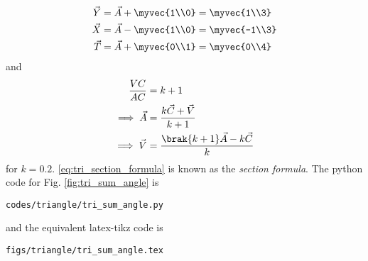 \begin{enumerate}[label=\arabic*.,ref=\thesubsection.\theenumi]
\begin{align}
\vec{Y} &= \vec{A} + \myvec{1\\0} = \myvec{1\\3}
\\
\vec{X} &= \vec{A} - \myvec{1\\0} = \myvec{-1\\3}
\\
\vec{T} &= \vec{A} + \myvec{0\\1} = \myvec{0\\4}
\end{align}
%
and 
\begin{align}
\frac{VC}{AC} &= k+1
\\
\label{eq:tri_section_formula}
\implies \vec{A} &= \frac{k\vec{C} + \vec{V}}{k+1}  
\\
\implies \vec{V} &= \frac{\brak{k+1}\vec{A} - k\vec{C}}{k}  
\end{align}
%
for $k = 0.2$. \eqref{eq:tri_section_formula} is known as the {\em section formula}.
%
The python code for  Fig. \ref{fig:tri_sum_angle} is
\begin{lstlisting}
codes/triangle/tri_sum_angle.py
\end{lstlisting}
%
and the equivalent latex-tikz code is
%
\begin{lstlisting}
figs/triangle/tri_sum_angle.tex
\end{lstlisting}
\end{enumerate}
